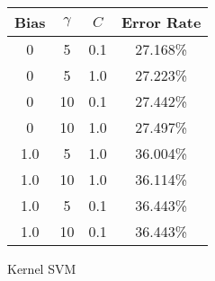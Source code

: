 \begin{center}
\begin{tabular}{|c|c|c|c|}
\hline
Bias & $\gamma$ & $C$ & Error Rate \\
\hline
0 & 5 & 0.1 & 27.168\% \\
\hline
0 & 5 & 1.0 & 27.223\% \\
\hline
0 & 10 & 0.1 & 27.442\% \\
\hline
0 & 10 & 1.0 & 27.497\% \\
\hline
1.0 & 5 & 1.0 & 36.004\% \\
\hline
1.0 & 10 & 1.0 & 36.114\% \\
\hline
1.0 & 5 & 0.1 & 36.443\% \\
\hline
1.0 & 10 & 0.1 & 36.443\% \\
\hline
\end{tabular}
\end{center}
\caption{Kernel SVM}\label{tab:svm_rbf_acctable}
